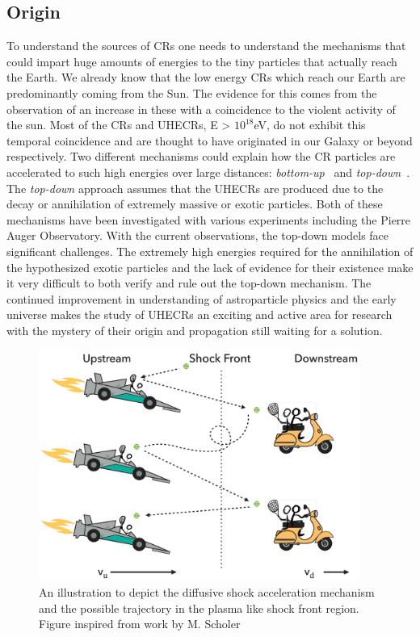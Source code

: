 \subsection{Origin}
\label{subsec:crorig}
To understand the sources of \glspl{CR} one needs to understand the mechanisms that could impart huge amounts of energies to the tiny particles that actually reach the Earth. We already know that the low energy \glspl{CR} which reach our Earth are predominantly coming from the Sun. The evidence for this comes from the observation of an increase in these with a coincidence to the violent activity of the sun. Most of the \glspl{CR} and \glspl{UHECR}, E > $10^{18}$eV, do not exhibit this temporal coincidence and are thought to have originated in our Galaxy or beyond respectively. Two different mechanisms could explain how the CR particles are accelerated to such high energies over large distances: \textit{bottom-up}~\cite{1984ARA&A..22..425H,Blandford_2000,1993A&A...272..161R} and \textit{top-down}~\cite{Bhattacharjee_2000,Busca_2006}. The \textit{top-down} approach assumes that the \glspl{UHECR} are produced due to the decay or annihilation of extremely massive or exotic particles.
Both of these mechanisms have been investigated with various experiments including the Pierre Auger Observatory. With the current observations, the top-down models face significant challenges. The extremely high energies required for the annihilation of the hypothesized exotic particles and the lack of evidence for their existence make it very difficult to both verify and rule out the top-down mechanism. The continued improvement in understanding of astroparticle physics and the early universe makes the study of \glspl{UHECR} an exciting and active area for research with the mystery of their origin and propagation still waiting for a solution. 

\begin{figure}[t!]
  \centering
  \includegraphics[width=10.5cm]{thesis_figures/CRnNu/Diffusive-shock-cartoon.pdf}
  \caption{An illustration to depict the diffusive shock acceleration mechanism and the possible trajectory in the plasma like shock front region. Figure inspired from work by M. Scholer}
  \label{fig:Shock_cartoon}
\end{figure}


